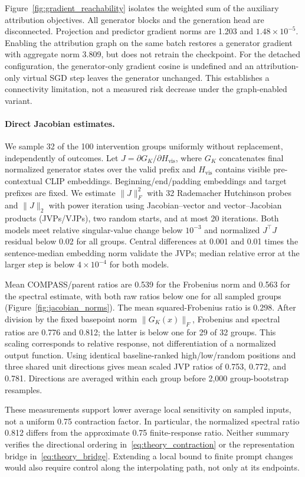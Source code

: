 Figure~\ref{fig:gradient_reachability} isolates the weighted sum of the
auxiliary attribution objectives.
All generator blocks and the generation head are disconnected. Projection
and predictor gradient norms are 1.203 and $1.48\times10^{-5}$.
Enabling the attribution graph on the same batch restores a generator gradient
with aggregate norm 3.809, but does not retrain the checkpoint.
For the detached configuration, the generator-only gradient cosine is
undefined and an attribution-only virtual SGD step leaves the generator
unchanged. This establishes a connectivity limitation, not a measured
risk decrease under the graph-enabled variant.

\paragraph{Direct Jacobian estimates.}
We sample 32 of the 100 intervention groups uniformly without replacement,
independently of outcomes. Let $J=\partial G_K/\partial H_{\mathrm{vis}}$,
where $G_K$ concatenates final normalized generator states over the valid
prefix and $H_{\mathrm{vis}}$ contains visible pre-contextual CLIP embeddings.
Beginning/end/padding embeddings and target prefixes are fixed.
We estimate $\|J\|_F^2$ with 32 Rademacher Hutchinson probes and $\|J\|_2$
with power iteration using Jacobian--vector and vector--Jacobian products
(JVPs/VJPs), two random starts, and at most 20 iterations. Both models meet
relative singular-value change below $10^{-3}$ and normalized
$J^\top J$ residual below 0.02 for all groups. Central differences at 0.001
and 0.01 times the sentence-median embedding norm validate the JVPs; median
relative error at the larger step is below $4\times10^{-4}$ for both models.

Mean COMPASS/parent ratios are 0.539 for the Frobenius norm and 0.563 for
the spectral estimate, with both raw ratios below one for all sampled groups
(Figure~\ref{fig:jacobian_norms}). The mean squared-Frobenius ratio is 0.298.
After division by the fixed basepoint norm $\|G_K(x)\|_F$, Frobenius and
spectral ratios are 0.776 and 0.812; the latter is below one for 29 of 32
groups. This scaling corresponds to relative response, not differentiation
of a normalized output function. Using identical baseline-ranked
high/low/random positions and three shared unit directions gives mean scaled
JVP ratios of 0.753, 0.772, and 0.781. Directions are averaged within each
group before 2,000 group-bootstrap resamples.

These measurements support lower average local sensitivity on sampled inputs,
not a uniform 0.75 contraction factor. In particular, the normalized spectral
ratio 0.812 differs from the approximate 0.75 finite-response ratio. Neither
summary verifies the directional ordering in~\eqref{eq:theory_contraction}
or the representation bridge in~\eqref{eq:theory_bridge}. Extending a local
bound to finite prompt changes would also require control along the
interpolating path, not only at its endpoints.